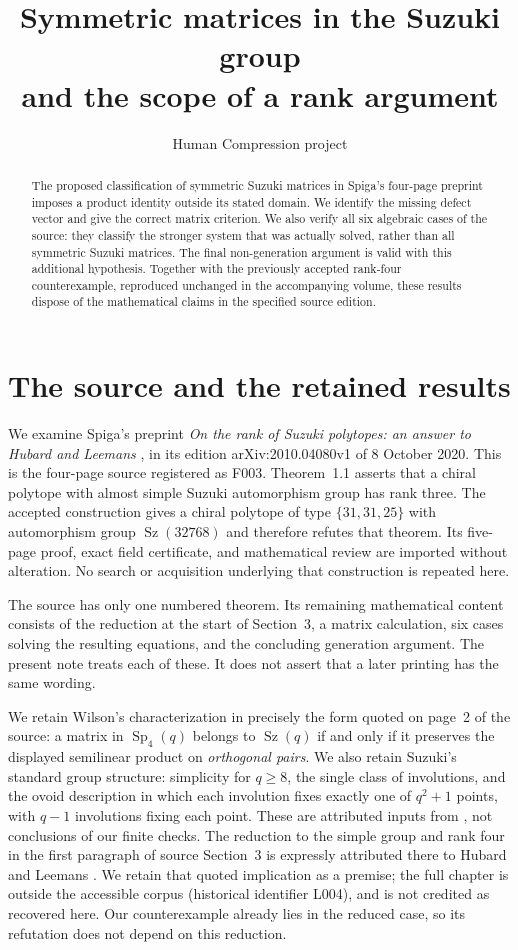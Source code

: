 \documentclass[11pt,a4paper]{article}
\title{Symmetric matrices in the Suzuki group\\and the scope of a rank argument}
\author{Human Compression project}
\date{}
\newcommand{\Sz}{\operatorname{Sz}}
\newcommand{\Sp}{\operatorname{Sp}}
\begin{document}
\maketitle
\begin{abstract}
The proposed classification of symmetric Suzuki matrices in
Spiga's four-page preprint imposes a product identity outside its
stated domain. We identify the missing defect vector and give the
correct matrix criterion. We also verify all six algebraic cases of
the source: they classify the stronger system that was actually
solved, rather than all symmetric Suzuki matrices. The final
non-generation argument is valid with this additional hypothesis.
Together with the previously accepted rank-four counterexample,
reproduced unchanged in the accompanying volume, these results
dispose of the mathematical claims in the specified source edition.
\end{abstract}

\section{The source and the retained results}
We examine Spiga's preprint \emph{On the rank of Suzuki polytopes:
an answer to Hubard and Leemans} \cite{Spiga}, in its edition
arXiv:2010.04080v1 of 8 October 2020.
This is the four-page source registered as F003.
Theorem~1.1 asserts that a chiral polytope with almost simple Suzuki
automorphism group has rank three. The accepted construction
\cite{Counterexample} gives a chiral polytope of type
$\{31,31,25\}$ with automorphism group $\Sz(32768)$ and therefore
refutes that theorem. Its five-page proof, exact field certificate,
and mathematical review are imported without alteration. No search
or acquisition underlying that construction is repeated here.

The source has only one numbered theorem. Its remaining mathematical
content consists of the reduction at the start of Section~3, a matrix
calculation, six cases solving the resulting equations, and the
concluding generation argument. The present note treats each of these.
It does not assert that a later printing has the same wording.

We retain Wilson's characterization in precisely the form quoted
on page~2 of the source: a matrix in $\Sp_4(q)$ belongs to $\Sz(q)$
if and only if it preserves the displayed semilinear product on
\emph{orthogonal pairs}. We also retain Suzuki's standard group
structure: simplicity for $q\geq8$, the single class of involutions,
and the ovoid description in which each involution fixes exactly one
of $q^2+1$ points, with $q-1$ involutions fixing each point. These are
attributed inputs from \cite{Wilson,Suzuki}, not conclusions of our
finite checks. The reduction to the simple group and rank four in
the first paragraph of source Section~3 is expressly attributed
there to Hubard and Leemans \cite[Theorem~1]{HL}. We retain that
quoted implication as a premise; the full chapter is outside the
accessible corpus (historical identifier L004), and is not credited
as recovered here. Our counterexample already lies in the reduced
case, so its refutation does not depend on this reduction.
\end{document}
